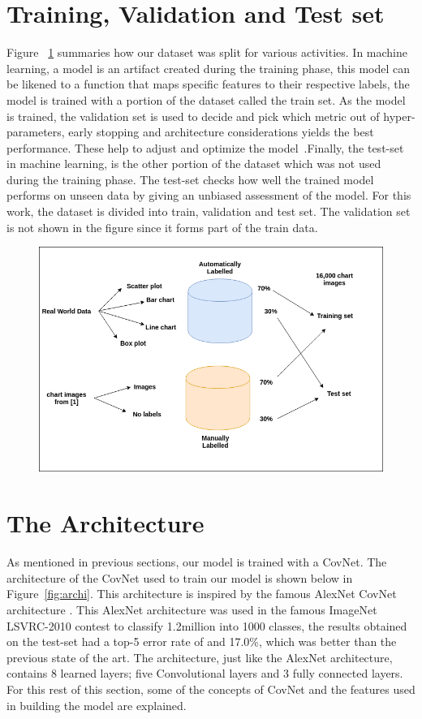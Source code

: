 \documentclass[12pt, a4paper,oneside]{report}
\begin{document}
\section{Training, Validation and Test set}
Figure ~\ref{fig:approach} summaries how our dataset was split for various activities. In machine learning, a model is an artifact created during the training phase, this model can be likened to a function that maps specific features to their respective labels, the model is trained with a portion of the dataset called the train set. As the model is trained, the validation set is used to decide and pick which metric out of hyper-parameters, early stopping and architecture considerations yields the best performance. These help to adjust and optimize the model~\cite{validation}.Finally, the test-set in machine learning, is the other portion of the dataset which was not used during the training phase. The test-set checks how well the trained model performs on unseen data by giving an unbiased assessment of the model. For this work, the dataset is divided into train, validation and test set. The validation set is not shown in the figure since it forms part of the train data.
\begin{figure}
\includegraphics [scale=0.5] {approach}
\label{fig:approach}
\end{figure}


\section{The Architecture}
As mentioned in previous sections, our model is trained with a CovNet. The architecture of the CovNet used to train our model is shown below in Figure~\ref{fig:archi}. This architecture is inspired by the famous AlexNet CovNet architecture  \cite{krizhevsky2012imagenet}. This AlexNet architecture was used in the famous ImageNet LSVRC-2010 contest to classify 1.2million into 1000 classes, the results obtained on the test-set had a top-5 error rate of and 17.0\%, which was better than the previous state of the art. The architecture, just like the AlexNet architecture, contains 8 learned layers; five Convolutional layers and 3 fully connected layers. For this rest of this section, some of the concepts of CovNet and the features used in building the model are explained.
\end{document}
